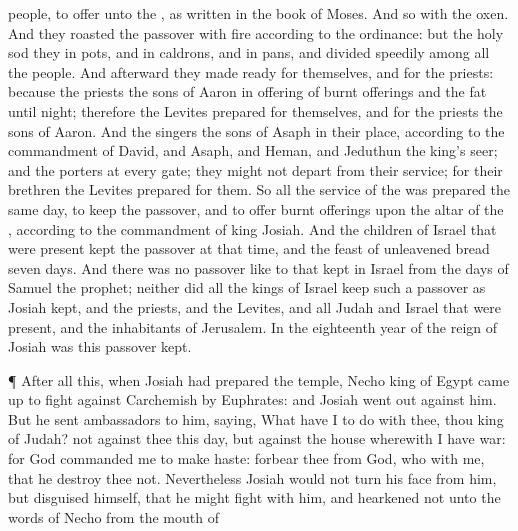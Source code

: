 {people, to
offer unto the
{}, as
{}
written in the
book of
Moses. And so
{} with the
oxen.
And they
roasted the
passover with
fire according to the
ordinance: but the
{}
holy
{}
sod they in
pots, and in
caldrons, and in
pans, and divided
{}
speedily among all the
people.
And
afterward they made
ready for themselves, and for the
priests: because the
priests the
sons of
Aaron
{} in
offering of burnt
offerings and the
fat until
night; therefore the
Levites
prepared for themselves, and for the
priests the
sons of
Aaron.
And the
singers the
sons of
Asaph
{} in their
place, according to the
commandment of
David, and
Asaph, and
Heman, and
Jeduthun the
king’s
seer; and the
porters
{} at every
gate; they might not
depart from their
service; for their
brethren the
Levites
prepared for them.
So all the
service of the
{} was
prepared the same
day, to
keep the
passover, and to
offer burnt
offerings upon the
altar of the
{}, according to the
commandment of
king
Josiah.
And the
children of
Israel that were
present
kept the
passover at that
time, and the
feast of unleavened
bread
seven
days.
And there was no
passover
like to that
kept in
Israel from the
days of
Samuel the
prophet; neither
did all the
kings of
Israel
keep such a
passover as
Josiah
kept, and the
priests, and the
Levites, and all
Judah and
Israel that were
present, and the
inhabitants of
Jerusalem.
In the
eighteenth
year of the
reign of
Josiah was this
passover
kept.
\par }{\PP {}¶
After all this, when
Josiah had
prepared the
temple,
Necho
king of
Egypt came
up to
fight against
Carchemish by
Euphrates: and
Josiah went
out
against him.
But he
sent
ambassadors to him,
saying, What have I to do with thee, thou
king of
Judah?
{} not against thee this
day, but against the
house wherewith I have
war: for
God
commanded me to make
haste:
forbear thee from
{}
God, who
{} with me, that he
destroy thee not.
Nevertheless
Josiah would not
turn his
face from him, but
disguised himself, that he might
fight with him, and
hearkened not unto the
words of
Necho from the
mouth of
}
